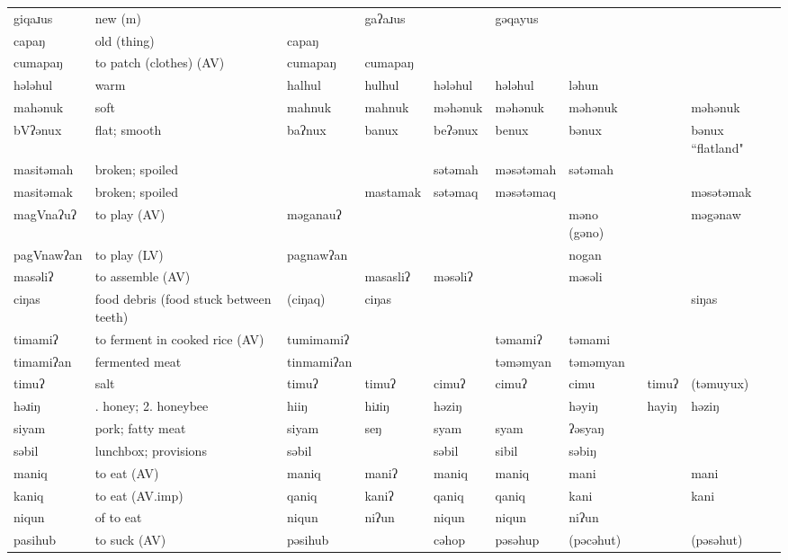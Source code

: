 \begin{landscape}
\begin{longtable}{*{9}{>{\raggedright\arraybackslash}p{}}}
\text{*}giqaɹus & new (m) &  & gaʔaɹus &  & gəqayus &  &  & \\
\text{*}capaŋ & old (thing) & capaŋ &  &  &  &  &  & \\
\text{*}cumapaŋ & to patch (clothes) (AV) & cumapaŋ & cumapaŋ &  &  &  &  & \\
\text{*}hələhul & warm & halhul & hulhul & hələhul & hələhul & ləhun &  & \\
\text{*}mahənuk & soft & mahnuk & mahnuk & məhənuk & məhənuk & məhənuk &  & məhənuk\\
\text{*}bVʔənux & flat; smooth & baʔnux & banux & beʔənux & benux & bənux &  & bənux ``flatland"\\
\text{*}masitəmah & broken; spoiled &  &  & sətəmah & məsətəmah & sətəmah &  & \\
\text{*}masitəmak & broken; spoiled &  & mastamak & sətəmaq & məsətəmaq &  &  & məsətəmak\\
\text{*}magVnaʔuʔ & to play (AV) & məganauʔ &  &  &  & məno (gəno) &  & məgənaw\\
\text{*}pagVnawʔan & to play (LV) & pagnawʔan &  &  &  & nogan &  & \\
\text{*}masəliʔ & to assemble (AV) &  & masasliʔ & məsəliʔ &  & məsəli &  & \\
\text{*}ciŋas & food debris (food stuck between teeth) & (ciŋaq) & ciŋas &  &  &  &  & siŋas\\
\text{*}timamiʔ & to ferment in cooked rice (AV) & tumimamiʔ &  &  & təmamiʔ & təmami &  & \\
\text{*}timamiʔan & fermented meat & tinmamiʔan &  &  & təməmyan & təməmyan &  & \\
\text{*}timuʔ & salt & timuʔ & timuʔ & cimuʔ & cimuʔ & cimu & timuʔ & (təmuyux)\\
\text{*}həɹiŋ & 1. honey; 2. honeybee & hiiŋ & hiɹiŋ & həziŋ &  & həyiŋ & hayiŋ & həziŋ\\
\text{*}siyam & pork; fatty meat & siyam & seŋ & syam & syam & ʔəsyaŋ &  & \\
\text{*}səbil & lunchbox; provisions & səbil &  & səbil & sibil & səbiŋ &  & \\
\text{*}maniq & to eat (AV) & maniq & maniʔ & maniq & maniq & mani &  & mani\\
\text{*}kaniq & to eat (AV.imp) & qaniq & kaniʔ & qaniq & qaniq & kani &  & kani\\
\text{*}niqun & of to eat & niqun & niʔun & niqun & niqun & niʔun &  & \\
\text{*}pasihub & to suck (AV) & pəsihub &  & cəhop & pəsəhup & (pəcəhut) &  & (pəsəhut)\\

\end{longtable}
\end{landscape}
